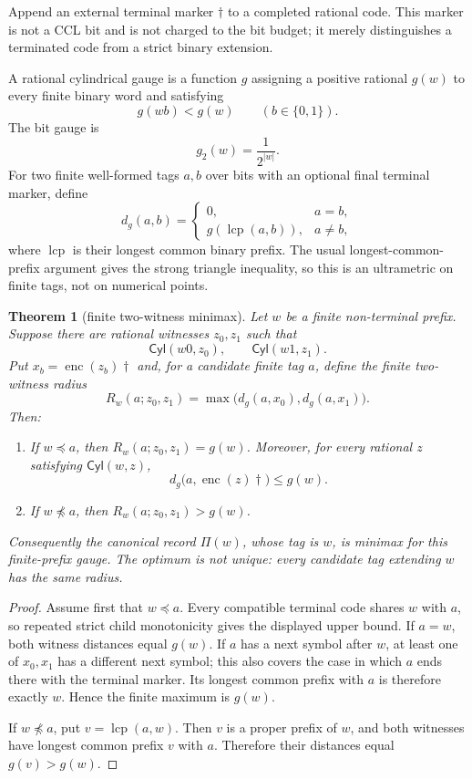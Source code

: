 \documentclass[10pt]{article}
\newtheorem{theorem}{Theorem}[section]
\theoremstyle{definition}
\theoremstyle{remark}
\newcommand{\bits}{\{0,1\}}
\newcommand{\pref}{\preccurlyeq}
\newcommand{\Cyl}{\mathsf{Cyl}}
\newcommand{\term}{\dagger}
\begin{document}
Append an external terminal marker $\term$ to a completed rational code.  This marker is not a CCL bit and is not charged to the bit budget; it merely distinguishes a terminated code from a strict binary extension.

A rational cylindrical gauge is a function $g$ assigning a positive rational $g(w)$ to every finite binary word and satisfying
\[
 g(wb)<g(w)\qquad(b\in\bits).
\]
The bit gauge is
\[
 g_2(w)=\frac1{2^{|w|}}.
\]
For two finite well-formed tags $a,b$ over bits with an optional final terminal marker, define
\[
 d_g(a,b)=
 \begin{cases}
 0,&a=b,\\
 g(\operatorname{lcp}(a,b)),&a\ne b,
 \end{cases}
\tag{7.4}
\]
where $\operatorname{lcp}$ is their longest common binary prefix.  The usual longest-common-prefix argument gives the strong triangle inequality, so this is an ultrametric on finite tags, not on numerical points.

\begin{theorem}[finite two-witness minimax]\label{thm:finite-minimax}
Let $w$ be a finite non-terminal prefix.  Suppose there are rational witnesses $z_0,z_1$ such that
\[
 \Cyl(w0,z_0),\qquad \Cyl(w1,z_1).
\]
Put $x_b=\operatorname{enc}(z_b)\term$ and, for a candidate finite tag $a$, define the finite two-witness radius
\[
 R_w(a;z_0,z_1)=\max\bigl(d_g(a,x_0),d_g(a,x_1)\bigr).
\]
Then:
\begin{enumerate}[label=\textup{(\alph*)}]
\item If $w\pref a$, then $R_w(a;z_0,z_1)=g(w)$.  Moreover, for every rational $z$ satisfying $\Cyl(w,z)$,
\[
 d_g\bigl(a,\operatorname{enc}(z)\term\bigr)\le g(w).
\]
\item If $w\not\pref a$, then $R_w(a;z_0,z_1)>g(w)$.
\end{enumerate}
Consequently the canonical record $\Pi(w)$, whose tag is $w$, is minimax for this finite-prefix gauge.  The optimum is not unique: every candidate tag extending $w$ has the same radius.
\end{theorem}

\begin{proof}
Assume first that $w\pref a$.  Every compatible terminal code shares $w$ with $a$, so repeated strict child monotonicity gives the displayed upper bound.  If $a=w$, both witness distances equal $g(w)$.  If $a$ has a next symbol after $w$, at least one of $x_0,x_1$ has a different next symbol; this also covers the case in which $a$ ends there with the terminal marker.  Its longest common prefix with $a$ is therefore exactly $w$.  Hence the finite maximum is $g(w)$.

If $w\not\pref a$, put $v=\operatorname{lcp}(a,w)$.  Then $v$ is a proper prefix of $w$, and both witnesses have longest common prefix $v$ with $a$.  Therefore their distances equal $g(v)>g(w)$.
\end{proof}
\end{document}
